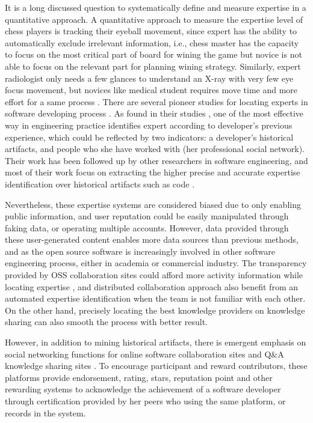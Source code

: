It is a long discussed question to systematically define and measure expertise in a quantitative approach. A quantitative approach to measure the expertise level of chess players is tracking their eyeball movement, since expert has the ability to automatically exclude irrelevant information, i.e., chess master has the capacity to focus on the most critical part of board for wining the game but novice is not able to focus on the relevant part for planning wining strategy. Similarly, expert radiologist only needs a few glances to understand an X-ray with very few eye focus movement, but novices like medical student requires move time and more effort for a same process \citep{bilalić2017neuroscience}. There are several pioneer studies for locating experts in software developing process \cite{mcdonald1998just, mcdonald2000expertise, mockus2002expertise, Reichling2007}. As \citeauthor{mcdonald2000expertise} found in their studies \cite{mcdonald1998just, mcdonald2000expertise}, one of the most effective way in engineering practice identifies expert according to developer's previous experience, which could be reflected by two indicators: a developer's historical artifacts, and people who she have worked with (her professional social network). Their work has been followed up by other researchers in software engineering, and most of their work focus on extracting the higher precise and accurate expertise identification over historical artifacts such as code \cite{ Anvik2006who, mockus2002expertise, Servant2011history}.

Nevertheless, these expertise systems are considered biased due to only enabling public information, and user reputation could be easily manipulated through faking data, or operating multiple accounts. However, data provided through these user-generated content enables more data sources than previous methods, and as the open source software is increasingly involved in other software engineering process, either in academia or commercial industry. The transparency provided by OSS collaboration sites could afford more activity information while locating expertise \cite{Dabbish2012social}, and distributed collaboration approach also benefit from an automated expertise identification when the team is not familiar with each other. On the other hand, precisely locating the best knowledge providers on knowledge sharing can also smooth the process with better result.

However, in addition to mining historical artifacts, there is emergent emphasis on social networking functions for online software collaboration sites \cite{Dabbish2012social} and Q\&A knowledge sharing sites \cite{vasilescu2014social}. To encourage participant and reward contributors, these platforms provide endorsement, rating, stars, reputation point and other rewarding systems to acknowledge the achievement of a software developer through certification provided by her peers who using the same platform, or records in the system. 

